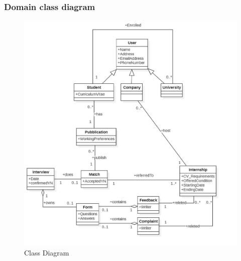 \documentclass{article}
\begin{document}
\subsubsection{Domain class diagram}
\begin{figure}[H]
    \centering
    \includegraphics[width=1\linewidth]{ClassDiagram.jpg}
    \caption{Class Diagram}
    \label{fig:enter-label}
\end{figure}
\end{document}
